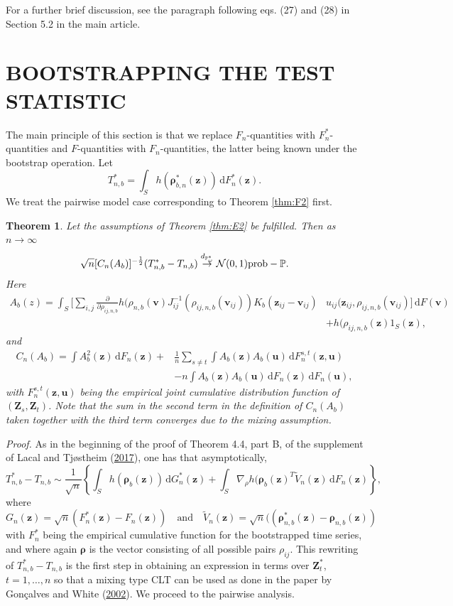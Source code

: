 \documentclass[
  12pt,
  letterpaper]{article}
\newtheorem{thm}{Theorem}[section]
\numberwithin{equation}{section}
\newcommand{\Z}{\bm{Z}}
\newcommand{\z}{\bm{z}}
\newcommand{\fv}{\bm{v}}
\newcommand{\fu}{\bm{u}}
\newcommand{\frho}{\bm{\rho}}
\newcommand{\di}{\,\textrm{d}}
\begin{document}
For a further brief discussion, see the paragraph following eqs. (27) and (28) in Section 5.2 in the main article.

\hypertarget{bootstrapping-the-test-statistic}{%
\section{BOOTSTRAPPING THE TEST STATISTIC}\label{bootstrapping-the-test-statistic}}

The main principle of this section is that we replace \(F_n\)-quantities with \(F_n^{*}\)-quantities and \(F\)-quantities with \(F_n\)-quantities, the latter being known under the bootstrap operation. Let
\[T_{n,b}^* = \int_S h(\frho_{b,n}^*(\z))\di F_n^*(\z).\]
We treat the pairwise model case corresponding to Theorem \ref{thm:F2} first.

\begin{thm}
Let the assumptions of Theorem \ref{thm:E2} be fulfilled. Then
as $n \to \infty$
$$
\sqrt{n}[C_{n}(A_b)]^{-\frac{1}{2}}(T_{n,b}^* - T_{n,b}) \stackrel{d_{\mathbb{P}_{\omega}^{*}}}{\to} {\cal N}(0,1) \mbox{prob}-\mathbb{P}.
$$
Here 
\begin{align*}
A_b(z) = \int_{S} \Big[\sum_{i,j}\frac{\partial}{\partial \rho_{ij,n,b}} h(\rho_{n,b}(\fv)J_{ij}^{-1}(\rho_{ij,n,b}(\fv_{ij}))K_b(\z_{ij}-\fv_{ij})&u_{ij}(\z_{ij},\rho_{ij,n,b}(\fv_{ij})\Big]  \di F(\fv) \\
& + h(\rho_{ij,n,b}(\z)1_S(\z),
\end{align*}
and 
\begin{align}
C_n(A_b) = \int A_b^2(\z)\di F_n(\z) + & \frac{1}{n}\sum_{s \neq t}\int A_b(\z)A_b(\fu)\di F^{s,t}_{n}(\z,\fu) \nonumber \\
& -  n\int A_b(\z)A_b(\fu) \di F_n(\z) \di F_n(\fu), 
\label{eq:t00}
\end{align}
with $F^{s,t}_{n}(\z,\fu)$ being the empirical joint cumulative distribution function of $(\Z_s,\Z_t)$. Note that the sum in the second term in the definition of $C_n(A_b)$ taken together with the third term converges due to the mixing assumption.
\label{thm:H1}
\end{thm}

\emph{Proof.} As in the beginning of the proof of Theorem 4.4, part B, of the supplement of Lacal and Tjøstheim (\protect\hyperlink{ref-lacal2017local}{2017}), one has that asymptotically,
\begin{equation}
T_{n,b}^* - T_{n,b}  \sim \frac{1}{\sqrt{n}} \left\{\int_S h(\frho_b(\z)) \di G_n^*(\z) + \int_S\nabla_{\rho}h(\frho_b(\z)^{T}\tilde{V}_n(\z) \di F_n(\z)\right\},
\label{eq:t11}
\end{equation}
where
\[
G_n(\z) = \sqrt{n}(F_n^*(\z) - F_n(\z)) \quad \mbox{and} \quad \tilde{V}_n(\z) = \sqrt{n}((\frho_{n,b}^{*}(\z) -\frho_{n,b}(\z))
\]
with \(F_n^*\) being the empirical cumulative function for the bootstrapped time series, and where again \(\frho\) is the vector consisting of all possible pairs \(\rho_{ij}\). This rewriting of \(T_{n,b}^*-T_{n,b}\) is the first step in obtaining an expression in terms over \(\Z^*_t\), \(t=1,\dots,n\) so that a mixing type CLT can be used as done in the paper by Gonçalves and White (\protect\hyperlink{ref-gonccalves2002bootstrap}{2002}). We proceed to the pairwise analysis.
\end{document}
